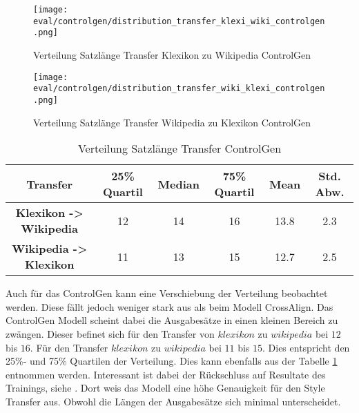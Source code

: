 \begin{figure}[H]
      \texttt{[image: eval/controlgen/distribution\_transfer\_klexi\_wiki\_controlgen.png]}
      \caption{Verteilung Satzlänge Transfer Klexikon zu Wikipedia ControlGen}\label{fig:distribution_transfer_klexi_wiki_controlgen}
    \endminipage\hfill
      \texttt{[image: eval/controlgen/distribution\_transfer\_wiki\_klexi\_controlgen.png]}
      \caption{Verteilung Satzlänge Transfer Wikipedia zu Klexikon ControlGen}\label{fig:distribution_transfer_wiki_klexi_controlgen}
    \endminipage\hfill       
 \end{figure}
 \begin{table}[H]
    \centering
    \begin{tabular}{|c|c|c|c|c|c|}
      \hline
      \textbf{Transfer}& \textbf{25\% Quartil}& \textbf{Median}& \textbf{75\% Quartil} & \textbf{Mean} &
      \textbf{Std. Abw.}\\
      \hline
      \textbf{Klexikon -> Wikipedia}& 12 & 14 & 16 & 13.8 & 2.3\\
      \hline
      \textbf{Wikipedia -> Klexikon}& 11 & 13 & 15 & 12.7 & 2.5\\
      \hline
    \end{tabular}
    \caption{Verteilung Satzlänge Transfer ControlGen}
    \label{tab:distribution_transfer_controlgen}
  \end{table} 
\noindent
\newline
Auch für das ControlGen kann eine Verschiebung der Verteilung beobachtet werden. Diese fällt jedoch weniger stark aus
als beim Modell CrossAlign. Das ControlGen Modell scheint dabei die Ausgabesätze in einen kleinen Bereich zu zwängen.
Dieser befinet sich für den Transfer von $ klexikon $ zu $ wikipedia $ bei $ 12 $ bis $ 16 $. Für den Transfer $
klexikon $ zu $ wikipedia $ bei $ 11 $ bis $ 15 $. Dies entspricht den 25\%- und 75\% Quartilen der Verteilung. Dies
kann ebenfalls aus der Tabelle \ref{tab:distribution_transfer_controlgen} entnommen werden. 
\newline
\newline
Interessant ist dabei der Rückschluss auf Resultate des Trainings, siehe .
Dort weis das Modell eine höhe Genauigkeit für den Style Transfer aus. Obwohl die Längen der Ausgabesätze sich minimal
unterscheidet.


